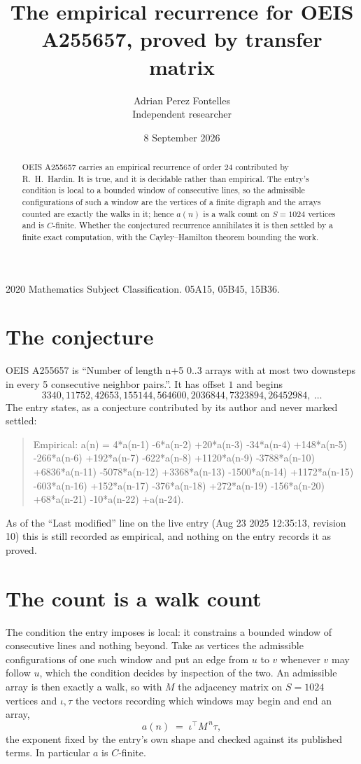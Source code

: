 \documentclass[11pt,a4paper]{article}
\title{The empirical recurrence for OEIS A255657, proved by transfer matrix}
\author{Adrian Perez Fontelles\\ \small Independent researcher}
\date{8 September 2026}
\theoremstyle{plain}
\theoremstyle{definition}
\begin{document}
\maketitle

\begin{abstract}
OEIS A255657 carries an empirical recurrence of order $24$ contributed by R.~H.~Hardin. It is
true, and it is decidable rather than empirical. The entry's condition is local to a bounded window of consecutive lines, so
the admissible configurations of such a window are the vertices of a finite digraph and the
arrays counted are exactly the walks in it; hence $a(n)$ is a walk count on $S=1024$ vertices
and is $C$-finite. Whether the conjectured recurrence annihilates it is then settled by a
finite exact computation, with the Cayley--Hamilton theorem bounding the work.
\end{abstract}

\noindent\small 2020 Mathematics Subject Classification. 05A15, 05B45, 15B36.\normalsize

\section{The conjecture}

OEIS A255657 is ``Number of length n+5 0..3 arrays with at most two downsteps in every 5 consecutive neighbor pairs.''. It has offset $1$ and begins
\[
3340, 11752, 42653, 155144, 564600, 2036844, 7323894, 26452984,\ \dots
\]
The entry states, as a conjecture contributed by its author and never marked settled:
\begin{quote}
Empirical: a(n) = 4*a(n-1) -6*a(n-2) +20*a(n-3) -34*a(n-4) +148*a(n-5) -266*a(n-6) +192*a(n-7) -622*a(n-8) +1120*a(n-9) -3788*a(n-10) +6836*a(n-11) -5078*a(n-12) +3368*a(n-13) -1500*a(n-14) +1172*a(n-15) -603*a(n-16) +152*a(n-17) -376*a(n-18) +272*a(n-19) -156*a(n-20) +68*a(n-21) -10*a(n-22) +a(n-24).
\end{quote}
As of the ``Last modified'' line on the live entry (Aug 23 2025 12:35:13, revision 10) this is still
recorded as empirical, and nothing on the entry records it as proved.

\section{The count is a walk count}

The condition the entry imposes is local: it constrains a bounded window of consecutive lines and nothing beyond. Take as
vertices the admissible configurations of one such window and put an edge from $u$ to $v$
whenever $v$ may follow $u$, which the condition decides by inspection of the two. An
admissible array is then exactly a walk, so with $M$ the adjacency matrix on $S=1024$ vertices
and $\iota,\tau$ the vectors recording which windows may begin and end an array,
\[
a(n)\;=\;\iota^{\!\top}M^{\,n}\tau ,
\]
the exponent fixed by the entry's own shape and checked against its published terms. In
particular $a$ is $C$-finite.
\end{document}
